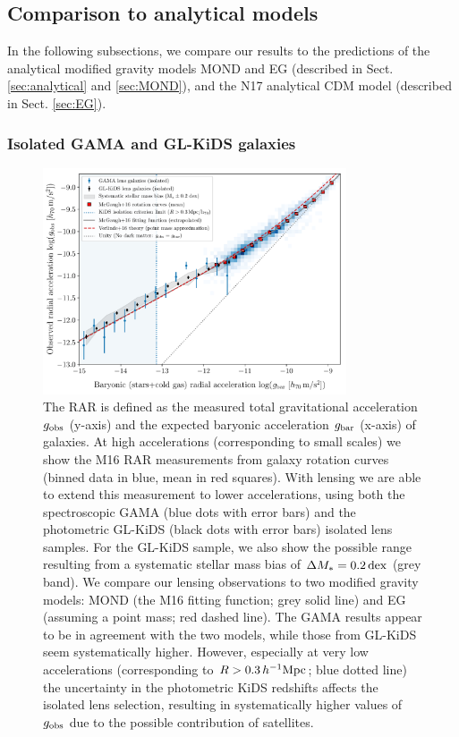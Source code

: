 \documentclass[usenatbib]{mnras}
\newcommand{\hMpc}{\, h^{-1}{\rm{Mpc}} }
\newcommand{\un}[1]{_{\rm #1}}
\newcommand{\dex}{\, {\rm dex}}
\begin{document}
\subsection{Comparison to analytical models}
\label{sec:results-analytical}

In the following subsections, we compare our results to the predictions of the analytical modified gravity models MOND and EG (described in Sect. \ref{sec:analytical} and \ref{sec:MOND}), and the N17 analytical CDM model (described in Sect. \ref{sec:EG}).

\subsubsection{Isolated GAMA and GL-KiDS galaxies}

\begin{figure}
	\includegraphics[width=0.8\textwidth]{Figures/RAR_KiDS+GAMA+Verlinde_Nobins_isolated_zoomout.pdf}
	\caption{The RAR is defined as the measured total gravitational acceleration $g\un{obs}$ (y-axis) and the expected baryonic acceleration $g\un{bar}$ (x-axis) of galaxies. At high accelerations (corresponding to small scales) we show the M16 RAR measurements from galaxy rotation curves (binned data in blue, mean in red squares). With lensing we are able to extend this measurement to lower accelerations, using both the spectroscopic GAMA (blue dots with error bars) and the photometric GL-KiDS (black dots with error bars) isolated lens samples. For the GL-KiDS sample, we also show the possible range resulting from a systematic stellar mass bias of $\Delta M_*=0.2 \dex$ (grey band). We compare our lensing observations to two modified gravity models: MOND (the M16 fitting function; grey solid line) and EG (assuming a point mass; red dashed line). The GAMA results appear to be in agreement with the two models, while those from GL-KiDS seem systematically higher. However, especially at very low accelerations (corresponding to $R > 0.3 \hMpc$; blue dotted line) the uncertainty in the photometric KiDS redshifts affects the isolated lens selection, resulting in systematically higher values of $g\un{obs}$ due to the possible contribution of satellites.}
	\label{fig:RAR_kids_gama}
\end{figure}
\end{document}
